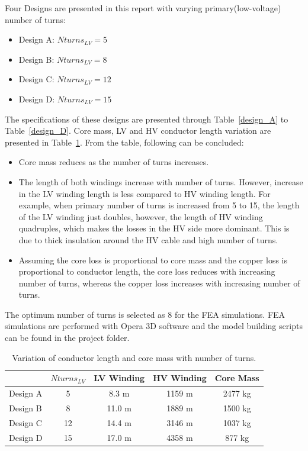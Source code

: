 \documentclass[a4paper, 11pt]{article} %
\begin{document}
Four Designs are presented in this report with varying primary(low-voltage) number of turns:

\begin{itemize}
\item Design A: $Nturns_{LV}=5$
\item Design B: $Nturns_{LV}=8$
\item Design C: $Nturns_{LV}=12$
\item Design D: $Nturns_{LV}=15$
\end{itemize}

The specifications of these designs are presented through Table~\ref{design_A} to Table~\ref{design_D}. Core mass, LV and HV conductor length variation are presented in Table~\ref{conductor_length}. From the table, following can be concluded:
\begin{itemize}
\item Core mass reduces as the number of turns increases.
\item The length of both windings increase with number of turns. However, increase in the LV winding length is less compared to HV winding length. For example, when primary number of turns is increased from  5 to 15, the length of the LV winding just doubles, however, the length of HV winding quadruples, which makes the losses in the HV side more dominant. This is due to thick insulation around the HV cable and high number of turns.
\item Assuming the core loss is proportional to core mass and the copper loss is proportional to conductor length, the core loss reduces with increasing number of turns, whereas the copper loss increases with increasing number of turns.
\end{itemize}

The optimum number of turns is selected as 8 for the FEA simulations. FEA simulations are performed with Opera 3D software and the model building scripts can be found in the project folder.

\begin{table}[]
\begin{center}
\begin{tabular}{lcccc}
& $Nturns_{LV}$ & LV Winding & HV Winding & Core Mass \\
\hline
Design A & 5 & 8.3 m & 1159 m & 2477 kg \\
Design B & 8 & 11.0 m & 1889 m & 1500 kg \\
Design C & 12 & 14.4 m & 3146 m & 1037 kg \\
Design D & 15 & 17.0 m & 4358 m & 877 kg \\
\hline
\end{tabular} 
\end{center}
\caption{Variation of conductor length and core mass with number of turns.}
\label{conductor_length}
\end{table}
\end{document}

